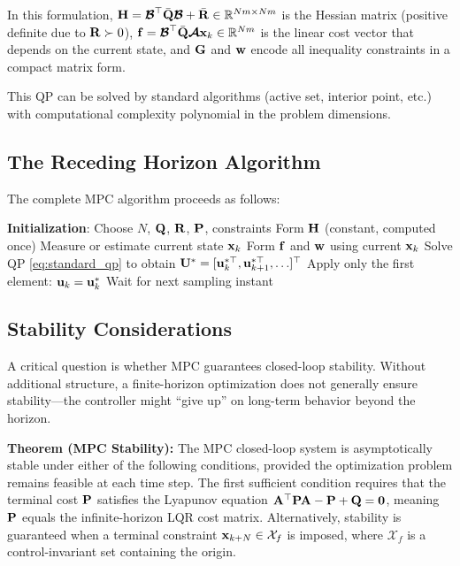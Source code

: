 In this formulation, $\mathbf{H} = \boldsymbol{\mathcal{B}}^\top \bar{\mathbf{Q}} \boldsymbol{\mathcal{B}} + \bar{\mathbf{R}} \in \mathbb{R}^{Nm \times Nm}$ is the Hessian matrix (positive definite due to $\mathbf{R} \succ 0$), $\mathbf{f} = \boldsymbol{\mathcal{B}}^\top \bar{\mathbf{Q}} \boldsymbol{\mathcal{A}} \mathbf{x}_k \in \mathbb{R}^{Nm}$ is the linear cost vector that depends on the current state, and $\mathbf{G}$ and $\mathbf{w}$ encode all inequality constraints in a compact matrix form.

This QP can be solved by standard algorithms (active set, interior point, etc.) with computational complexity polynomial in the problem dimensions.

\subsection{The Receding Horizon Algorithm}

The complete MPC algorithm proceeds as follows:

\begin{algorithm}[H]
\caption{Model Predictive Control Algorithm}
\label{alg:mpc}
\begin{algorithmic}[1]
\State \textbf{Initialization}: Choose $N$, $\mathbf{Q}$, $\mathbf{R}$, $\mathbf{P}$, constraints
\State Form $\mathbf{H}$ (constant, computed once)
    \State Measure or estimate current state $\mathbf{x}_k$
    \State Form $\mathbf{f}$ and $\mathbf{w}$ using current $\mathbf{x}_k$
    \State Solve QP \eqref{eq:standard_qp} to obtain $\mathbf{U}^* = [\mathbf{u}_k^{*\top}, \mathbf{u}_{k+1}^{*\top}, \ldots]^\top$
    \State Apply only the first element: $\mathbf{u}_k = \mathbf{u}_k^*$
    \State Wait for next sampling instant
\EndFor
\end{algorithmic}
\end{algorithm}

\subsection{Stability Considerations}

A critical question is whether MPC guarantees closed-loop stability. Without additional structure, a finite-horizon optimization does not generally ensure stability---the controller might ``give up'' on long-term behavior beyond the horizon.

\textbf{Theorem (MPC Stability):} The MPC closed-loop system is asymptotically stable under either of the following conditions, provided the optimization problem remains feasible at each time step. The first sufficient condition requires that the terminal cost $\mathbf{P}$ satisfies the Lyapunov equation $\mathbf{A}^\top \mathbf{P} \mathbf{A} - \mathbf{P} + \mathbf{Q} = \mathbf{0}$, meaning $\mathbf{P}$ equals the infinite-horizon LQR cost matrix. Alternatively, stability is guaranteed when a terminal constraint $\mathbf{x}_{k+N} \in \mathcal{X}_f$ is imposed, where $\mathcal{X}_f$ is a control-invariant set containing the origin.

